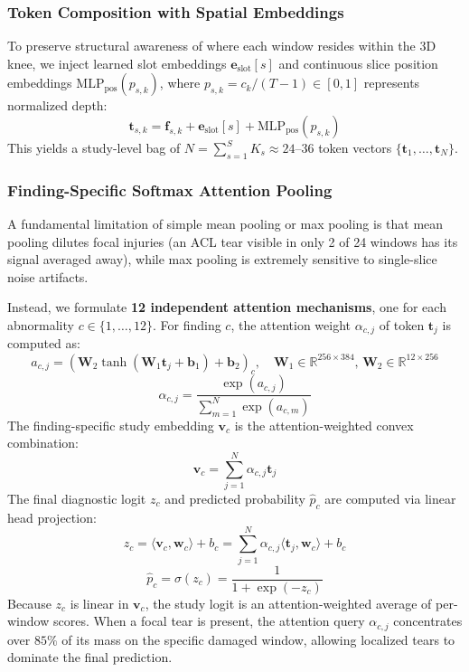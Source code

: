 \documentclass[11pt,a4paper]{article}
\begin{document}
\subsubsection{Token Composition with Spatial Embeddings}
To preserve structural awareness of where each window resides within the 3D knee, we inject learned slot embeddings $\mathbf{e}_{\text{slot}}[s]$ and continuous slice position embeddings $\text{MLP}_{\text{pos}}(p_{s,k})$, where $p_{s,k} = c_k / (T-1) \in [0, 1]$ represents normalized depth:
\begin{equation}
    \mathbf{t}_{s,k} = \mathbf{f}_{s,k} + \mathbf{e}_{\text{slot}}[s] + \text{MLP}_{\text{pos}}(p_{s,k})
\end{equation}
This yields a study-level bag of $N = \sum_{s=1}^S K_s \approx 24\text{--}36$ token vectors $\{\mathbf{t}_1, \dots, \mathbf{t}_N\}$.

\subsubsection{Finding-Specific Softmax Attention Pooling}
A fundamental limitation of simple mean pooling or max pooling is that mean pooling dilutes focal injuries (an ACL tear visible in only 2 of 24 windows has its signal averaged away), while max pooling is extremely sensitive to single-slice noise artifacts.

Instead, we formulate \textbf{12 independent attention mechanisms}, one for each abnormality $c \in \{1, \dots, 12\}$. For finding $c$, the attention weight $\alpha_{c,j}$ of token $\mathbf{t}_j$ is computed as:
\begin{equation}
    a_{c,j} = \left(\mathbf{W}_2 \tanh(\mathbf{W}_1 \mathbf{t}_j + \mathbf{b}_1) + \mathbf{b}_2\right)_c, \quad \mathbf{W}_1 \in \mathbb{R}^{256 \times 384}, \, \mathbf{W}_2 \in \mathbb{R}^{12 \times 256}
\end{equation}
\begin{equation}
    \alpha_{c,j} = \frac{\exp(a_{c,j})}{\sum_{m=1}^N \exp(a_{c,m})}
\end{equation}
The finding-specific study embedding $\mathbf{v}_c$ is the attention-weighted convex combination:
\begin{equation}
    \mathbf{v}_c = \sum_{j=1}^N \alpha_{c,j} \mathbf{t}_j
\end{equation}
The final diagnostic logit $z_c$ and predicted probability $\hat{p}_c$ are computed via linear head projection:
\begin{equation}
    z_c = \langle \mathbf{v}_c, \mathbf{w}_c \rangle + b_c = \sum_{j=1}^N \alpha_{c,j} \langle \mathbf{t}_j, \mathbf{w}_c \rangle + b_c
\end{equation}
\begin{equation}
    \hat{p}_c = \sigma(z_c) = \frac{1}{1 + \exp(-z_c)}
\end{equation}
Because $z_c$ is linear in $\mathbf{v}_c$, the study logit is an attention-weighted average of per-window scores. When a focal tear is present, the attention query $\alpha_{c,j}$ concentrates over $85\%$ of its mass on the specific damaged window, allowing localized tears to dominate the final prediction.
\end{document}
